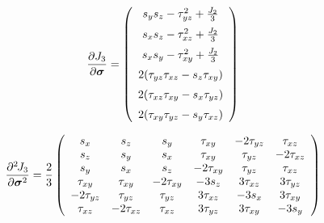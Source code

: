 \begin{eqnarray}
\mbox{$\displaystyle\frac{\partial{J_3}}{\partial{\mbox{\boldmath$\sigma$}}}$} = \left(\begin{array}{c}
s_y s_z - \tau_{yz}^2 + \frac{J_2}{3}
\\[2mm]
s_x s_z - \tau_{xz}^2 + \frac{J_2}{3}
\\[2mm]
s_x s_y - \tau_{xy}^2 + \frac{J_2}{3}
\\[2mm]
2(\tau_{yz}\tau_{xz} - s_z \tau_{xy})
\\[2mm]
2(\tau_{xz}\tau_{xy} - s_x \tau_{yz})
\\[2mm]
2(\tau_{xy}\tau_{yz} - s_y \tau_{xz})
\end{array}\right)
\end{eqnarray}

\begin{eqnarray}
\mbox{$\displaystyle\frac{\partial^{2}\>\!\!{J_3}}{\partial{\mbox{\boldmath$\sigma$}}^{2}}$} = \frac{2}{3}\left(\begin{array}{cccccc}
       s_{x} &        s_{z} &        s_{y} &    \tau_{xy} & -2 \tau_{yz} &    \tau_{xz}
\\
       s_{z} &        s_{y} &        s_{x} &    \tau_{xy} &    \tau_{yz} & -2 \tau_{xz}
\\
       s_{y} &        s_{x} &        s_{z} & -2 \tau_{xy} &    \tau_{yz} &    \tau_{xz}
\\
   \tau_{xy} &    \tau_{xy} & -2 \tau_{xy} &     -3 s_{z} &  3 \tau_{xz} &  3 \tau_{yz}
\\
-2 \tau_{yz} &    \tau_{yz} &    \tau_{yz} &  3 \tau_{xz} &     -3 s_{x} &  3 \tau_{xy}
\\
   \tau_{xz} & -2 \tau_{xz} &    \tau_{xz} &  3 \tau_{yz} &  3 \tau_{xy} &     -3 s_{y}
\end{array}\right)
\end{eqnarray}



